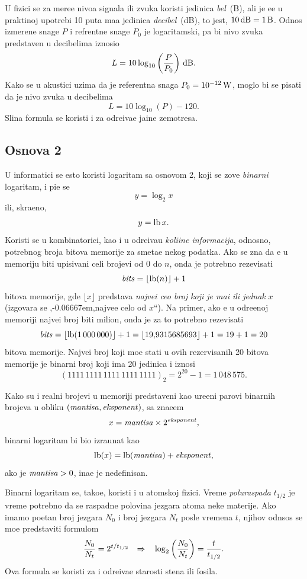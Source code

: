 \documentclass[12pt, twoside, a4paper]{article}
\def\navod#1{\relax,\kern-0.06667em,\relax#1\relax``\relax}
\def\logten{\log_{10}}
\def\logtwo{\log_2}
\def\puta{\times}
\def\.{{,}}
\def\th{t_{1/2}}
\def\um#1{\,{\rm#1}}
\begin{document}
U fizici se za mere{\nj}e nivoa signala ili zvuka koristi jedinica {\sl be\/l}~(B), ali je {\cv}e{\sv}{\cc}e
u prakti{\cv}noj upotrebi 10 puta ma{\nj}a jedinica {\sl decibel\/}~(dB), to jest, $10\um{dB}=1\um{B}$.
Odnos izmerene snage $P$ i refrentne snage $P_0$ je logaritamski,
pa bi nivo zvuka predstav{\lj}en u decibelima iznosio
$$
L=10\logten\left({P\over P_0}\right)\um{dB}.
$$
Kako se u akustici uzima da je referentna snaga $P_0=10^{-12}\um W$, moglo bi se pisati
da je nivo zvuka u decibelima
$$
L=10\logten(P)-120.
$$
Sli{\cv}na formula se koristi i za odre{\dj}iva{\nj}e ja{\cv}ine zem{\lj}otresa.

\subsection{Osnova 2}

\def\lb{\mathop{\rm lb}}
\def\bits{{\it bits}}
\def\mant{{\it mantisa}}%
\def\expo{{\it eksponent}}%
\def\znak{{\it znak}}%

U informatici se {\cv}esto koristi logaritam sa osnovom 2, koji se zove {\sl binarni\/} logaritam,
i pi{\sv}e se
$$
y=\logtwo x
$$
ili, skra{\cc}eno,
$$
y=\lb x.
$$
Koristi se u kombinatorici, kao i u odre{\dj}iva{\nj}u {\sl koli{\cv}ine informacija},
odnosno, potrebnog broja bitova me\-mo\-ri\-je za sme{\sv}ta{\nj}e nekog podatka.
Ako se zna da {\cc}e u me\-mo\-ri\-ju biti upisivani celi brojevi od 0 do $n$, onda je potrebno rezevisati
$$
\bits = \lfloor\lb(n)\rfloor+1
$$
bitova memorije, gde $\lfloor x\rfloor$ predstav{\lj}a {\sl najve{\cc}i ceo broj koji je ma{\nj}i ili jednak} $x$
(izgovara se \navod{najve{\cc}e celo od $x$}). 
Na primer, ako {\cc}e u odre{\dj}enoj memoriji najve{\cc}i 
broj biti milion, onda je za to potrebno rezevisati
$$
\bits=\lfloor\lb(1\,000\,000)\rfloor+1=\lfloor 19\.9315685693\rfloor+1 = 19+1=20
$$
bitova memorije. Najve{\cc}i broj koji mo{\zv}e stati u ovih rezervisanih 20 bitova memorije je binarni broj koji ima 20 jedinica
i iznosi 
$$
(1111\,1111\,1111\,1111\,1111)_2=
2^{20}-1=1\,048\,575.
$$

Kako su i realni brojevi u memoriji predstav{\lj}eni kao ure{\dj}eni parovi binarnih brojeva u obliku
$(\mant,\expo)$, sa zna{\cv}e{\nj}em
$$
x=\mant\puta2^\expo,
$$
binarni logaritam bi bio izra{\cv}unat kao
$$
\lb(x)=\lb(\mant)+\expo,
$$
ako je $\mant>0$, ina{\cv}e je nedefinisan.

\smallskip

Binarni logaritam se, tako{\dj}e, koristi i u atomskoj fizici.
Vreme {\sl poluraspada\/} $\th$ je vreme potrebno da se raspadne polovina jezgara atoma neke materije. 
Ako imamo po{\cv}etan broj jezgara $N_0$ i broj jezgara $N_t$ posle vremena $t$, njihov odnsos
se mo{\zv}e pred\-sta\-vi\-ti formulom
\begin{equation}
\label{eq:halftime}
{N_0\over N_t}=2^{t/\th}\sledi \logtwo\left( {N_0\over N_t} \right)={t\over\th}.
\end{equation}
Ova formula se koristi za i odre{\dj}iva{\nj}e starosti stena ili fosila.
\end{document}
